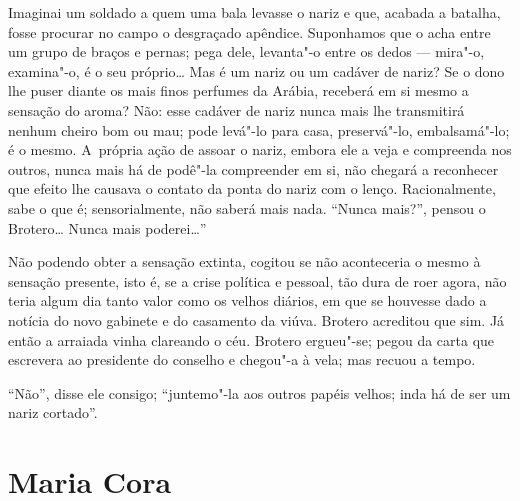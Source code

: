 \begin{linenumbers}
Imaginai um soldado a quem uma bala levasse o nariz e que, acabada a
batalha, fosse procurar no campo o desgraçado apêndice. Suponhamos que o
acha entre um grupo de braços e pernas; pega dele, levanta"-o entre os
dedos --- mira"-o, examina"-o, é o seu próprio\ldots{} Mas é um nariz ou um
cadáver de nariz? Se o dono lhe puser diante os mais finos perfumes da
Arábia, receberá em si mesmo a sensação do aroma? Não: esse cadáver de
nariz nunca mais lhe transmitirá nenhum cheiro bom ou mau; pode levá"-lo
para casa, preservá"-lo, embalsamá"-lo; é o mesmo. A~própria ação de
assoar o nariz, embora ele a veja e compreenda nos outros, nunca mais há
de podê"-la compreender em si, não chegará a reconhecer que efeito lhe
causava o contato da ponta do nariz com o lenço. Racionalmente, sabe o
que é; sensorialmente, não saberá mais nada. ``Nunca mais?'', pensou o
Brotero\ldots{} Nunca mais poderei\ldots{}''

Não podendo obter a sensação extinta, cogitou se não aconteceria o mesmo
à sensação presente, isto é, se a crise política e pessoal, tão dura de
roer agora, não teria algum dia tanto valor como os velhos diários, em
que se houvesse dado a notícia do novo gabinete e do casamento da viúva.
Brotero acreditou que sim. Já então a arraiada vinha clareando o céu.
Brotero ergueu"-se; pegou da carta que escrevera ao presidente do
conselho e chegou"-a à vela; mas recuou a tempo.

``Não'', disse ele consigo; ``juntemo"-la aos outros papéis velhos; inda
há de ser um nariz cortado''.

\end{linenumbers}

\chapter{Maria Cora}


